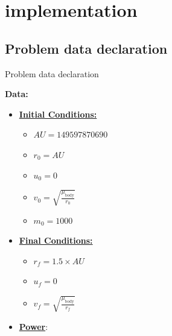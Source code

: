 \documentclass{article}
\begin{document}
	\section{implementation}
	
	\subsection{Problem data declaration}
	
	\begin{algorithm}[H]
		\caption{Problem data declaration}\label{alg:satellite_maneuvering}
		\begin{algorithmic}
			\State \textbf{Data:} \\
			\begin{itemize}[]
				\item \textbf{\underline{Initial Conditions:}}
				\begin{itemize}
					\item $AU = 149597870690$
					\item $r_0 = AU$
					\item $u_0 = 0$
					\item $v_0 = \sqrt{\frac{\mu_{\text{body}}}{r_0}}$
					\item$ m_0=1000$
				\end{itemize}
				\item \textbf{\underline{Final Conditions:}}
				\begin{itemize}
					\item $r_f = 1.5 \times AU$
					\item $u_f = 0$
					\item $v_f = \sqrt{\frac{\mu_{\text{body}}}{r_f}}$
				\end{itemize}
				\item \textbf{\underline{Power}}:

\end{itemize}
\end{algorithmic}
\end{algorithm}
\end{document}
